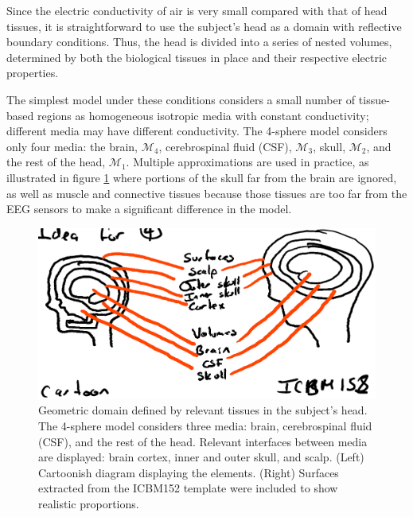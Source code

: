 Since the electric conductivity of air is very small compared with that of head tissues, it is straightforward to use the subject's head as a domain with reflective boundary conditions. 
%
Thus, the head is divided into a series of nested volumes, determined by both the biological tissues in place and their respective electric properties.

The simplest model under these conditions considers a small number of tissue-based regions as homogeneous isotropic media with constant conductivity; different media may have different conductivity.
%
The 4-sphere model considers only four media: the brain, $\mathcal{M}_4$, cerebrospinal fluid (CSF), $\mathcal{M}_3$, skull, $\mathcal{M}_2$, and the rest of the head, $\mathcal{M}_1$.
%
Multiple approximations are used in practice, as illustrated in figure \ref{fig:diagrams2} where portions of the skull far from the brain are ignored, as well as muscle and connective tissues 
because those tissues are too far from the EEG sensors to make a significant difference in the model.

\begin{figure}
\centering
\includegraphics[width=0.8\linewidth]{./img_dev/nsHeadSurfacesVolumes}
\caption{Geometric domain defined by relevant tissues in the subject's head. The 4-sphere model considers three media: brain, cerebrospinal fluid (CSF), and the rest of the head. Relevant interfaces between media are displayed: brain cortex, inner and outer skull, and scalp. (Left) Cartoonish diagram displaying the elements. (Right) Surfaces extracted from the ICBM152 template were included to show realistic proportions.}
\label{fig:diagrams2}
\end{figure}


